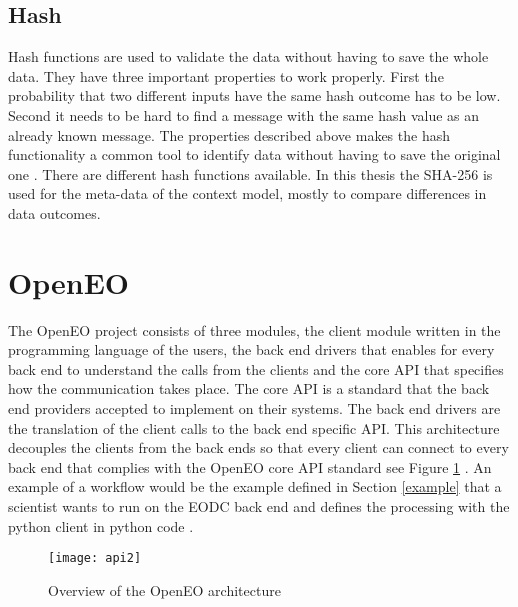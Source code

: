 \documentclass[draft,final]{vutinfth} %
\begin{document}
\subsection{Hash}\label{Hash}
Hash functions are used to validate the data without having to save the whole data. They have three important properties to work properly. First the probability that two different inputs have the same hash outcome has to be low. Second it needs to be hard to find a message with the same hash value as an already known message. The properties described above makes the hash functionality a common tool to identify data without having to save the original one \cite{3b412889270f46f59740fbf1ca8cd7e0}.  
There are different hash functions available. In this thesis the SHA-256 is used for the meta-data of the context model, mostly to compare differences in data outcomes.




\section{OpenEO}\label{OpenEO}
The OpenEO project consists of three modules, the client module written in the programming language of the users, the back end drivers that enables for every back end to understand the calls from the clients and the core API that specifies how the communication takes place. The core API is a standard that the back end providers accepted to implement on their systems. The back end drivers are the translation of the client calls to the back end specific API. This architecture decouples the clients from the back ends so that every client can connect to every back end that complies with the OpenEO core API standard see Figure \ref{fig:api2} . An example of a workflow would be the example defined in Section \ref{example} that a scientist wants to run on the EODC back end and defines the processing with the python client in python code \cite{openeo}.  

\begin{figure}[h]
	\centering
	\texttt{[image: api2]}
	\caption{Overview of the OpenEO architecture}
	\label{fig:api2} %
\end{figure}
\end{document}
